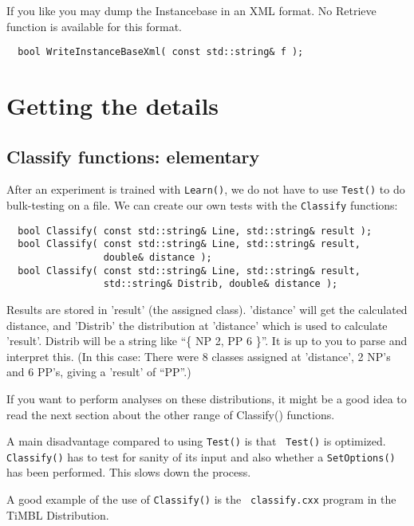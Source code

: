 \documentclass{report}
\begin{document}
If you like you may dump the Instancebase in an XML format. No Retrieve
function is available for this format.

\begin{footnotesize}
\begin{verbatim}
  bool WriteInstanceBaseXml( const std::string& f );
\end{verbatim}
\end{footnotesize}

\chapter{Getting the details}

\section{Classify functions: elementary}
After an experiment is trained with {\tt Learn()}, we do not have to use
{\tt Test()} to do bulk-testing on a file.
We can create our own tests with the {\tt Classify} functions:

\begin{footnotesize}
\begin{verbatim}
  bool Classify( const std::string& Line, std::string& result );
  bool Classify( const std::string& Line, std::string& result, 
                 double& distance );
  bool Classify( const std::string& Line, std::string& result,
                 std::string& Distrib, double& distance );
\end{verbatim}
\end{footnotesize}

Results are stored in 'result' (the assigned class). 'distance' will
get the calculated distance, and 'Distrib' the distribution at
'distance' which is used to calculate 'result'.  Distrib will be a
string like ``\{ NP 2, PP 6 \}''. It is up to you to parse and
interpret this. (In this case: There were 8 classes assigned at
'distance', 2 NP's and 6 PP's, giving a 'result' of ``PP''.)

If you want to perform analyses on these distributions, it might be a
good idea to read the next section about the other range of Classify()
functions.

A main disadvantage compared to using {\tt Test()} is that {\tt
  Test()} is optimized.  {\tt Classify()} has to test for sanity of
its input and also whether a {\tt SetOptions()} has been
performed. This slows down the process.

A good example of the use of {\tt Classify()} is the {\tt
 classify.cxx} program in the TiMBL Distribution.
\end{document}
